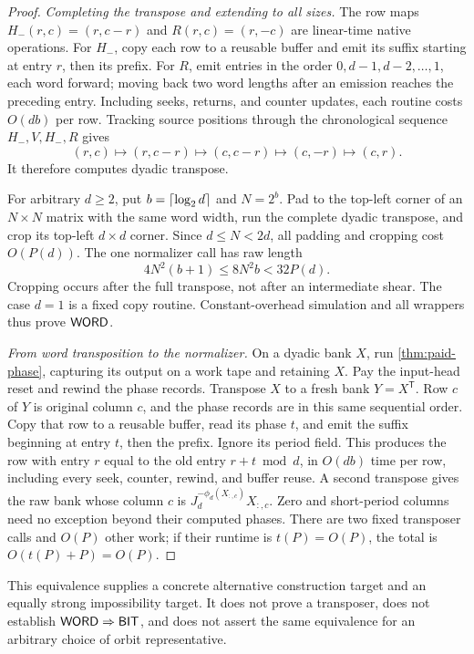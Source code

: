 \begin{proof}
\emph{Completing the transpose and extending to all sizes.}
The row maps $H_-(r,c)=(r,c-r)$ and $R(r,c)=(r,-c)$ are linear-time
native operations. For $H_-$, copy each row to a reusable buffer and
emit its suffix starting at entry $r$, then its prefix. For $R$, emit
entries in the order $0,d-1,d-2,\ldots,1$, each word forward; moving
back two word lengths after an emission reaches the preceding entry.
Including seeks, returns, and counter updates, each routine costs
$O(db)$ per row. Tracking source positions through the chronological
sequence $H_-,V,H_-,R$ gives
\[
 (r,c)\longmapsto(r,c-r)\longmapsto(c,c-r)
       \longmapsto(c,-r)\longmapsto(c,r).
\]
It therefore computes dyadic transpose.

For arbitrary $d\ge2$, put $b=\left\lceil \log_2d\right\rceil$ and $N=2^b$.
Pad to the top-left corner of an $N\times N$ matrix with the same
word width, run the complete dyadic transpose, and crop its top-left
$d\times d$ corner. Since $d\le N<2d$, all padding and cropping
cost $O(P(d))$. The one normalizer call has raw length
\[
 4N^2(b+1)\le8N^2b<32P(d).
\]
Cropping occurs after the full transpose, not after an intermediate
shear. The case $d=1$ is a fixed copy routine. Constant-overhead
simulation and all wrappers thus prove $\mathsf{WORD}$.

\emph{From word transposition to the normalizer.}
On a dyadic bank $X$, run \cref{thm:paid-phase}, capturing its output
on a work tape and retaining $X$. Pay the input-head reset and rewind
the phase records. Transpose $X$ to a fresh bank $Y=X^{\mathsf T}$.
Row $c$ of $Y$ is original column $c$, and the phase records are in
this same sequential order. Copy that row to a reusable buffer, read
its phase $t$, and emit the suffix beginning at entry $t$, then the
prefix. Ignore its period field. This produces the row with entry $r$
equal to the old entry $r+t\bmod d$, in $O(db)$ time per row, including
every seek, counter, rewind, and buffer reuse. A second transpose gives
the raw bank whose column $c$ is $J_d^{-\phi_d(X_{:,c})}X_{:,c}$.
Zero and short-period columns need no exception beyond their computed
phases. There are two fixed transposer calls and $O(P)$ other work;
if their runtime is $t(P)=O(P)$, the total is $O(t(P)+P)=O(P)$.
\end{proof}

This equivalence supplies a concrete alternative construction target and
an equally strong impossibility target. It does not prove a transposer,
does not establish $\mathsf{WORD}\Rightarrow\mathsf{BIT}$, and does not assert the
same equivalence for an arbitrary choice of orbit representative.


